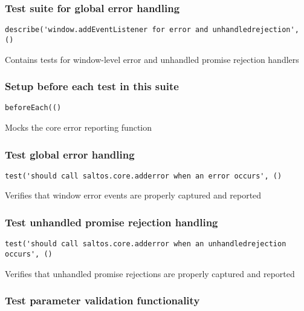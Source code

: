 \documentclass[a4paper]{article}
\begin{document}
\hypertarget{toc49}{}
\subsubsection{Test suite for global error handling}

\begin{lstlisting}
describe('window.addEventListener for error and unhandledrejection', ()
\end{lstlisting}

Contains tests for window-level error and unhandled promise rejection handlers

\hypertarget{toc50}{}
\subsubsection{Setup before each test in this suite}

\begin{lstlisting}
beforeEach(()
\end{lstlisting}

Mocks the core error reporting function

\hypertarget{toc51}{}
\subsubsection{Test global error handling}

\begin{lstlisting}
test('should call saltos.core.adderror when an error occurs', ()
\end{lstlisting}

Verifies that window error events are properly captured and reported

\hypertarget{toc52}{}
\subsubsection{Test unhandled promise rejection handling}

\begin{lstlisting}
test('should call saltos.core.adderror when an unhandledrejection occurs', ()
\end{lstlisting}

Verifies that unhandled promise rejections are properly captured and reported

\hypertarget{toc53}{}
\subsubsection{Test parameter validation functionality}
\end{document}

